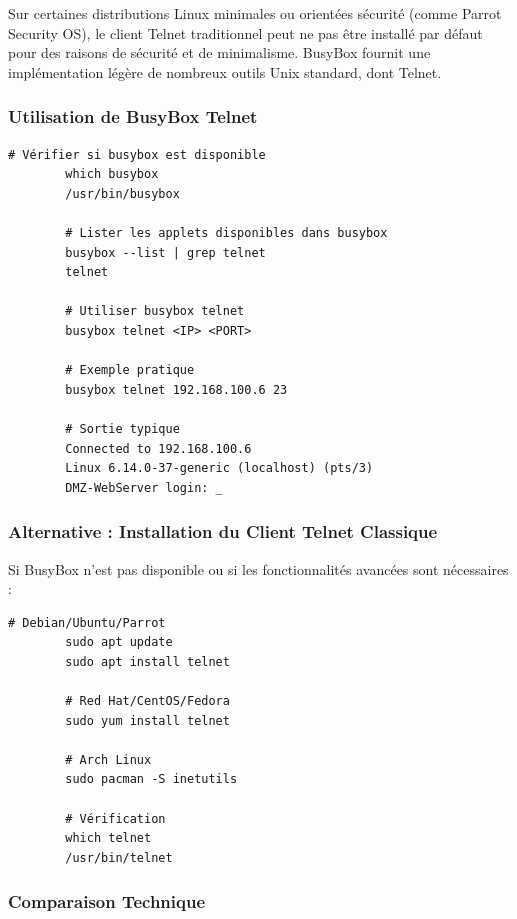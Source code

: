 \documentclass[12pt,a4paper,openany]{report}
\begin{document}
	Sur certaines distributions Linux minimales ou orientées sécurité (comme Parrot 
	Security OS), le client Telnet traditionnel peut ne pas être installé par défaut 
	pour des raisons de sécurité et de minimalisme. BusyBox fournit une implémentation 
	légère de nombreux outils Unix standard, dont Telnet.
	
	\subsubsection{Utilisation de BusyBox Telnet}
	
	\begin{lstlisting}[caption=Utilisation de BusyBox pour Telnet]
		# Vérifier si busybox est disponible
		which busybox
		/usr/bin/busybox
		
		# Lister les applets disponibles dans busybox
		busybox --list | grep telnet
		telnet
		
		# Utiliser busybox telnet
		busybox telnet <IP> <PORT>
		
		# Exemple pratique
		busybox telnet 192.168.100.6 23
		
		# Sortie typique
		Connected to 192.168.100.6
		Linux 6.14.0-37-generic (localhost) (pts/3)
		DMZ-WebServer login: _
	\end{lstlisting}
	
	\subsubsection{Alternative : Installation du Client Telnet Classique}
	
	Si BusyBox n'est pas disponible ou si les fonctionnalités avancées sont nécessaires :
	
	\begin{lstlisting}[caption=Installation du client Telnet traditionnel]
		# Debian/Ubuntu/Parrot
		sudo apt update
		sudo apt install telnet
		
		# Red Hat/CentOS/Fedora
		sudo yum install telnet
		
		# Arch Linux
		sudo pacman -S inetutils
		
		# Vérification
		which telnet
		/usr/bin/telnet
	\end{lstlisting}
	
	\subsubsection{Comparaison Technique}
	
\end{document}
